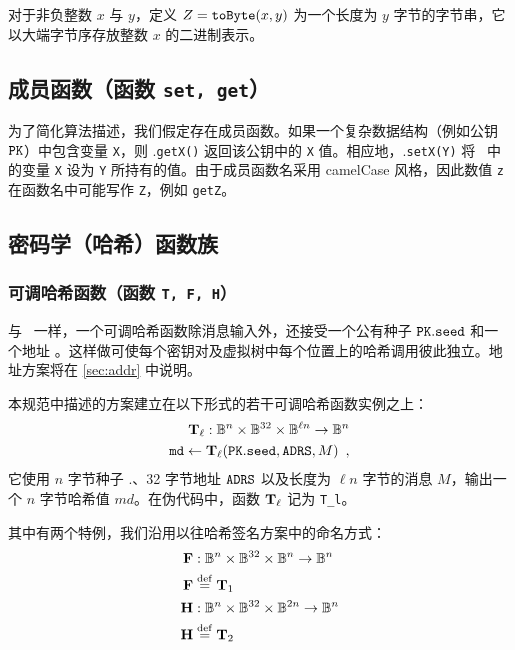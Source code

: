 对于非负整数 $x$ 与 $y$，定义 $Z = {\tt toByte}(x,y)$ 为一个长度为 $y$ 字节的字节串，它以大端字节序存放整数 $x$ 的二进制表示。

\subsection{成员函数（函数 \texttt{set, get}）}

为了简化算法描述，我们假定存在成员函数。如果一个复杂数据结构（例如公钥 $\pk$）中包含变量 \texttt{X}，则 \pk.\texttt{getX()} 返回该公钥中的 \texttt{X} 值。相应地，\pk.\texttt{setX(Y)} 将 \pk\ 中的变量 \texttt{X} 设为 \texttt{Y} 所持有的值。由于成员函数名采用 camelCase 风格，因此数值 \texttt{z} 在函数名中可能写作 \texttt{Z}，例如 \texttt{getZ}。

\subsection{密码学（哈希）函数族}

\subsubsection{可调哈希函数（函数 \texttt{T, F, H}）}

与 \SPHINCSP\ 一样，一个可调哈希函数除消息输入外，还接受一个公有种子 $\pk.\seed$ 和一个地址 \ADRS。这样做可使每个密钥对及虚拟树中每个位置上的哈希调用彼此独立。地址方案将在 \cref{sec:addr} 中说明。

本规范中描述的方案建立在以下形式的若干可调哈希函数实例之上：
\begin{align*}
    \Th_\ell : \byte^n \times \byte^{32} \times \byte^{\ell n} \to \byte^n \\
    \md \gets \Th_\ell (\pk.\seed, \ADRS, M) \enspace,
\end{align*}
它使用 $n$ 字节种子 \pk.\seed、32 字节地址 $\mathtt{ADRS}$ 以及长度为 $\ell n$ 字节的消息 $M$，输出一个 $n$ 字节哈希值 $md$。在伪代码中，函数 $\mathbf{T}_\ell$ 记为 \texttt{T\_l}。

其中有两个特例，我们沿用以往哈希签名方案中的命名方式：
\begin{align*}
    \mathbf{F}& : \mathbb{B}^{n}\times \mathbb{B}^{32}\times \mathbb{B}^{n}\rightarrow \mathbb{B}^{n} \\
    \mathbf{F}& \stackrel{\rm def}{=} \mathbf{T}_1\\
    \mathbf{H}& : \mathbb{B}^{n}\times \mathbb{B}^{32}\times \mathbb{B}^{2n}\rightarrow \mathbb{B}^{n} \\
    \mathbf{H}& \stackrel{\rm def}{=} \mathbf{T}_2
\end{align*}

